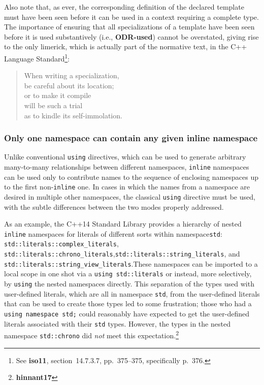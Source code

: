 \noindent Also note that, as ever, the corresponding definition of the declared
template must have been seen before it can be used in a context
requiring a complete type. The importance of ensuring that all
specializations of a template have been seen before it is used
substantively (i.e., \textbf{ODR-used}) cannot be overstated, giving
rise to the only limerick, which is actually part of the normative text,
in the C++ Language Standard{\cprotect\footnote{See \textbf{{iso11}},
  section~14.7.3.7, pp.~375--375, specifically p.~376.}}:
\begin{quote}
When writing a specialization,\\
be careful about its location;\\
or to make it compile\\
will be such a trial\\
as to kindle its self-immolation.
\end{quote}

\subsubsection[Only one namespace can contain any given {\tt inline} namespace]{Only one namespace can contain any given {\SubsubsecCode inline} namespace}\label{only-one-namespace-can-contain-any-given-inline-namespace}

Unlike conventional \texttt{using} directives, which can be used to
generate arbitrary many-to-many relationships between different
namespaces, \texttt{inline} namespaces can be used only to contribute
names to the sequence of enclosing namespaces up to the first
non-\texttt{inline} one. In cases in which the names from a namespace
are desired in multiple other namespaces, the classical \texttt{using}
directive must be used, with the subtle differences between the two
modes properly addressed.

As an example, the C++14 Standard Library provides a hierarchy of nested
\texttt{inline} namespaces for literals of different sorts within
namespace\linebreak[4] \texttt{std}: \texttt{std::literals::complex\_literals},
\texttt{std::literals::chrono\_literals},\linebreak[4]
\texttt{std::literals::string\_literals}, and
\texttt{std::literals::string\_view\_literals}.\linebreak[4] 
These namespaces can
be imported to a local scope in one shot via a
\texttt{using}~\texttt{std::literals} or instead, more selectively, by
\texttt{using} the nested namespaces directly. This separation of the
types used with user-defined literals, which are all in namespace
\texttt{std}, from the user-defined literals that can be used to create
those types led to some frustration; those who had a
\texttt{using}~\texttt{namespace}~\texttt{std;} could reasonably have
expected to get the user-defined literals associated with their
\texttt{std} types. However, the types in the nested namespace
\texttt{std::chrono} did \emph{not} meet this
expectation.{\cprotect\footnote{\textbf{hinnant17}}}

